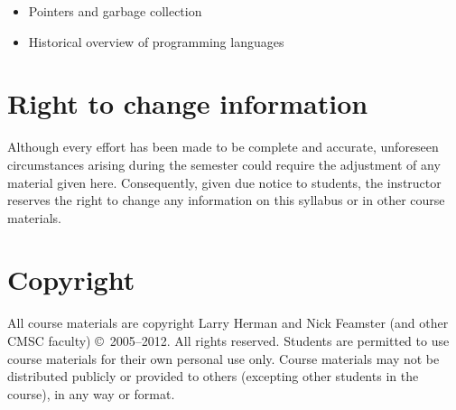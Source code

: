 \documentclass[10pt]{article}
\begin{document}
\begin{multicols}{2}
\begin{itemize}
              \vspace{-2.5mm}

        \item Pointers and garbage collection


        \item Historical overview of programming languages

      \end{itemize}

      \vspace{-2mm}

    \end{multicols}

  \section{Right to change information}

    Although every effort has been made to be complete and accurate,
  unforeseen circumstances arising during the semester could require the
  adjustment of any material given here.  Consequently, given due notice to
  students, the instructor reserves the right to change any information on
  this syllabus or in other course materials.

  \section{Copyright}

    All course materials are copyright Larry Herman and Nick Feamster (and
  other CMSC faculty) \copyright\ 2005--2012.  All rights reserved.
  Students are permitted to use course materials for their own personal use
  only.  Course materials may not be distributed publicly or provided to
  others (excepting other students in the course), in any way or format.
\end{document}
